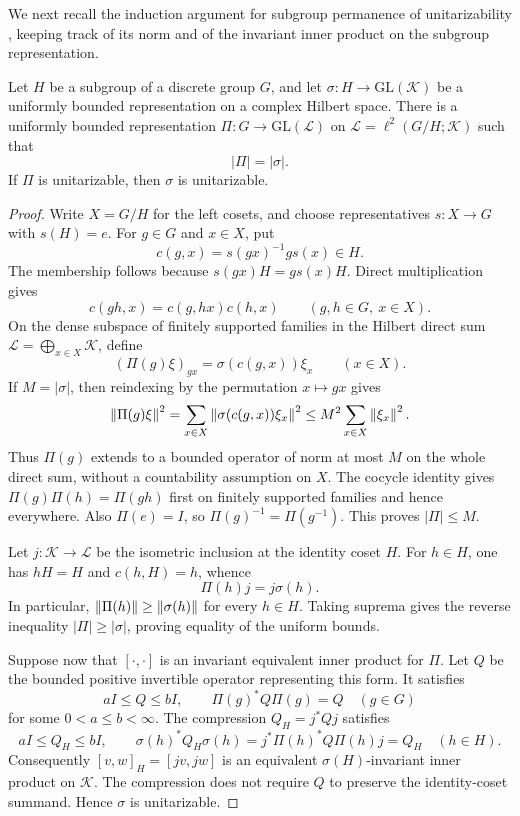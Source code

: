We next recall the induction argument for subgroup permanence of
unitarizability \cite[Proposition~0.5]{Pisier2004}, keeping track of its
norm and of the invariant inner product on the subgroup representation.

\begin{lemma}\label{lem:subgroup-induction}
Let \(H\) be a subgroup of a discrete group \(G\), and let
\(\sigma:H\to\mathrm{GL}(\mathcal K)\) be a uniformly bounded
representation on a complex Hilbert space. There is a uniformly bounded
representation \(\Pi:G\to\mathrm{GL}(\mathcal L)\) on
\(\mathcal L=\ell^2(G/H;\mathcal K)\) such that
\[
 |\Pi|=|\sigma|.
\]
If \(\Pi\) is unitarizable, then \(\sigma\) is unitarizable.
\end{lemma}

\begin{proof}
Write \(X=G/H\) for the left cosets, and choose representatives
\(s:X\to G\) with \(s(H)=e\). For \(g\in G\) and \(x\in X\), put
\[
 c(g,x)=s(gx)^{-1}g s(x)\in H.
\]
The membership follows because \(s(gx)H=gs(x)H\). Direct multiplication
gives
\[
 c(gh,x)=c(g,hx)c(h,x)\qquad(g,h\in G,\ x\in X).
\]
On the dense subspace of finitely supported families in the Hilbert
direct sum \(\mathcal L=\bigoplus_{x\in X}\mathcal K\), define
\[
 (\Pi(g)\xi)_{gx}=\sigma(c(g,x))\xi_x\qquad(x\in X).
\]
If \(M=|\sigma|\), then reindexing by the permutation \(x\mapsto gx\)
gives
\[
 \left\lVert\Pi(g)\xi\right\rVert^2
 =\sum_{x\in X}\left\lVert\sigma(c(g,x))\xi_x\right\rVert^2
 \le M^2\sum_{x\in X}\left\lVert\xi_x\right\rVert^2.
\]
Thus \(\Pi(g)\) extends to a bounded operator of norm at most \(M\) on
the whole direct sum, without a countability assumption on \(X\).
The cocycle identity gives \(\Pi(g)\Pi(h)=\Pi(gh)\) first on finitely
supported families and hence everywhere. Also \(\Pi(e)=I\), so
\(\Pi(g)^{-1}=\Pi(g^{-1})\). This proves \(|\Pi|\le M\).

Let \(j:\mathcal K\to\mathcal L\) be the isometric inclusion at the
identity coset \(H\). For \(h\in H\), one has \(hH=H\) and
\(c(h,H)=h\), whence
\[
 \Pi(h)j=j\sigma(h).
\]
In particular, \(\left\lVert\Pi(h)\right\rVert\ge\left\lVert\sigma(h)\right\rVert\) for every
\(h\in H\). Taking suprema gives the reverse inequality
\(|\Pi|\ge|\sigma|\), proving equality of the uniform bounds.

Suppose now that \([\cdot,\cdot]\) is an invariant equivalent inner
product for \(\Pi\). Let \(Q\) be the bounded positive invertible operator
representing this form. It satisfies
\[
 aI\le Q\le bI,\qquad \Pi(g)^*Q\Pi(g)=Q\quad(g\in G)
\]
for some \(0<a\le b<\infty\). The compression \(Q_H=j^*Qj\) satisfies
\[
 aI\le Q_H\le bI,\qquad
 \sigma(h)^*Q_H\sigma(h)
 =j^*\Pi(h)^*Q\Pi(h)j=Q_H\quad(h\in H).
\]
Consequently \([v,w]_H=[jv,jw]\) is an equivalent
\(\sigma(H)\)-invariant inner product on \(\mathcal K\). The compression
does not require \(Q\) to preserve the identity-coset summand. Hence
\(\sigma\) is unitarizable.
\end{proof}


